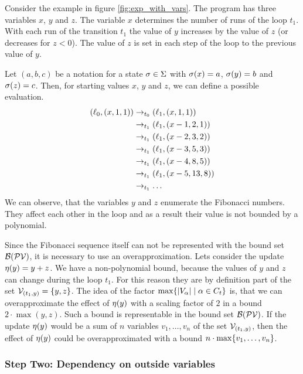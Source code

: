Consider the example in figure \ref{fig:exp_with_vars}.
The program has three variables $x$, $y$ and $z$.
The variable $x$ determines the number of runs of the loop $t_1$.
With each run of the transition $t_1$ the value of $y$ increases by the value of $z$ (or decreases for $z < 0$).
The value of $z$ is set in each step of the loop to the previous value of $y$.

Let $(a,b,c)$ be a notation for a state $\sigma \in \Sigma$ with $\sigma(x) = a$, $\sigma(y) = b$ and $\sigma(z) = c$.
Then, for starting values $x$, $y$ and $z$, we can define a possible evaluation.
\begin{align*}
  (\ell_0, (x,1,1)) & \rightarrow_{t_0} (\ell_1, (x,1,1)) \\
  & \rightarrow_{t_1} (\ell_1, (x-1,2,1)) \\
  & \rightarrow_{t_1} (\ell_1, (x-2,3,2)) \\
  & \rightarrow_{t_1} (\ell_1, (x-3,5,3)) \\
  & \rightarrow_{t_1} (\ell_1, (x-4,8,5)) \\
  & \rightarrow_{t_1} (\ell_1, (x-5,13,8)) \\
  & \rightarrow_{t_1} \dots
\end{align*}
We can observe, that the variables $y$ and $z$ enumerate the Fibonacci numbers.
They affect each other in the loop and as a result their value is not bounded by a polynomial.

Since the Fibonacci sequence itself can not be represented with the bound set $\mathcal{B}(\mathcal{PV})$, it is necessary to use an overapproximation.
Lets consider the update $\eta(y) = y + z$.
We have a non-polynomial bound, because the values of $y$ and $z$ can change during the loop $t_1$.
For this reason they are by definition part of the set $\mathcal{V}_{(t_1,y)} = \lbrace y,z \rbrace$.
The idea of the factor $\max \lbrace \left|V_\alpha\right| \mid \alpha \in C_t \rbrace$ is, that we can overapproximate the effect of $\eta(y)$ with a scaling factor of $2$ in a bound $2 \cdot \max(y,z)$.
Such a bound is representable in the bound set $\mathcal{B}(\mathcal{PV})$.
If the update $\eta(y)$ would be a sum of $n$ variables $v_1, \dots, v_n$ of the set $\mathcal{V}_{(t_1,y)}$, then the effect of $\eta(y)$ could be overapproximated with a bound $n \cdot \max \lbrace v_1, \dots, v_n \rbrace$.

\subsubsection{Step Two: Dependency on outside variables}

